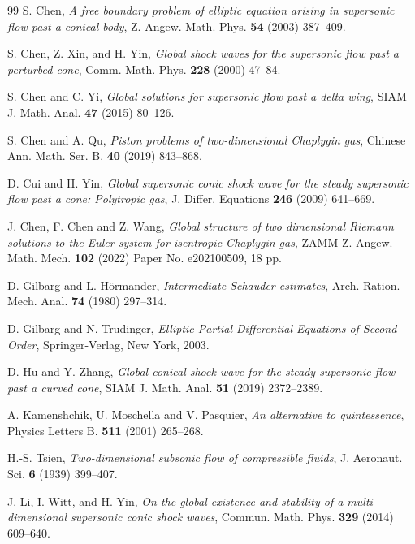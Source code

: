 \documentclass[reqno,12pt]{amsart}
\numberwithin{equation}{section}
\begin{document}
\begin{thebibliography}{99}
 S. Chen, {\it A free boundary problem of elliptic equation arising in supersonic flow past a conical body}, Z. Angew. Math. Phys. {\bf 54} (2003) 387--409.

 S. Chen, Z. Xin, and H. Yin, {\it Global shock waves for the supersonic flow past a perturbed cone}, Comm. Math. Phys. {\bf 228} (2000) 47--84.

 S. Chen and C. Yi, {\it Global solutions for supersonic flow past a delta wing}, SIAM J. Math. Anal. {\bf 47} (2015) 80--126.

 S. Chen and A. Qu, {\it Piston problems of two-dimensional Chaplygin gas}, Chinese Ann. Math. Ser. B. {\bf 40} (2019) 843--868.

 D. Cui and H. Yin, {\it Global supersonic conic shock wave for the steady supersonic flow past a cone: Polytropic gas}, J. Differ. Equations {\bf 246} (2009) 641--669.

 J. Chen, F. Chen and Z. Wang, {\it Global structure of two dimensional Riemann solutions to the Euler system for isentropic Chaplygin gas}, ZAMM Z. Angew. Math. Mech. {\bf 102} (2022) Paper No. e202100509, 18 pp.


 D. Gilbarg and L. H\"{o}rmander, {\it Intermediate Schauder estimates}, Arch. Ration. Mech. Anal. {\bf 74} (1980) 297--314.

 D. Gilbarg and N. Trudinger, {\it Elliptic Partial Differential Equations of Second Order}, Springer-Verlag, New York, 2003.

 D. Hu and Y. Zhang, {\it Global conical shock wave for the steady supersonic flow past a curved cone},  SIAM J. Math. Anal. {\bf 51} (2019) 2372--2389.

 A. Kamenshchik, U. Moschella and V. Pasquier, {\it An alternative to quintessence}, Physics Letters B. {\bf 511} (2001) 265--268.

 H.-S. Tsien, {\it Two-dimensional subsonic flow of compressible fluids}, J. Aeronaut. Sci. {\bf 6} (1939) 399--407.

 J. Li, I. Witt, and H. Yin, {\it On the global existence and stability of a multi-dimensional supersonic conic shock waves}, Commun. Math. Phys. {\bf 329} (2014) 609--640.


\end{thebibliography}
\end{document}
